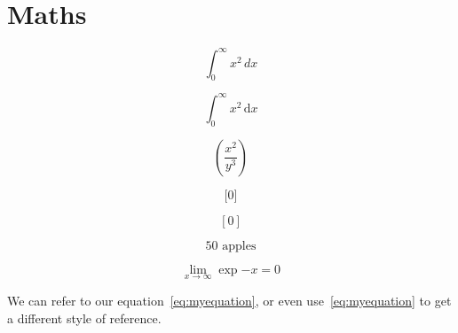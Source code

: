 \documentclass[12pt,twoside,a4paper]{article}
\begin{document}
\section{Maths}

\[ \int_0^\infty x^2\,dx \]

\[ \int_0^\infty x^2\,\mathrm{d}x\]

\[  \left(\frac{x^2}{y^3}\right) \]

\[ \Bigg[ 0\Bigg] \]

\[ [ 0 ] \]

\[ 50 \text{ apples} \]

\begin{equation}
\label{eq:myequation}
    \lim_{x \to \infty} \exp{-x} = 0
\end{equation}

We can refer to our equation~\ref{eq:myequation}, or even use~\eqref{eq:myequation} to get a different style of reference.
\end{document}
